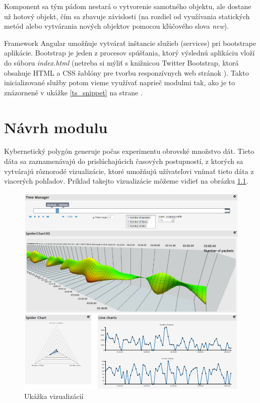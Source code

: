 \documentclass[
  digital, %
  twoside, %
  notable,   %
  nolof,   %
  nolot,   %
]{fithesis3}
\begin{document}
Komponent sa tým pádom nestará o vytvorenie samotného objektu, ale dostane už hotový objekt, čím sa zbavuje závislosti (na rozdiel od využívania statických metód alebo vytvárania nových objektov pomocou kľúčového slova \textit{new}).

Framework Angular umožňuje vytvárať inštancie služieb (services) pri bootstrape aplikácie. Bootstrap je jeden z procesov spúšťania, ktorý výslednú aplikáciu vloží do súboru \textit{index.html} \cite{angular} (netreba si mýliť s knižnicou Twitter Bootstrap, ktorá obsahuje HTML a CSS šablóny pre tvorbu responzívnych web stránok \cite{peska2017thesis}). Takto inicializované služby potom vieme využívať naprieč modulmi tak, ako je to znázornené v ukážke \ref{ts_snippet} na strane \pageref{ts_snippet}.

\chapter{Návrh modulu}

Kybernetický polygón generuje počas experimentu obrovské množstvo dát. Tieto dáta sa zaznamenávajú do prislúchajúcich časových postupností, z ktorých sa vytvárajú rôznorodé vizualizácie, ktoré umožňujú užívateľovi vnímať tieto dáta z viacerých pohľadov. Príklad takejto vizualizácie môžeme vidieť na obrázku \ref{visualization}.

\begin{figure}
	\center
	\includegraphics[width=1.0\linewidth]{visualization}
	\caption{Ukážka vizualizácií\cite{eichler2014analytical}}
	\label{visualization}
\end{figure}
\end{document}
